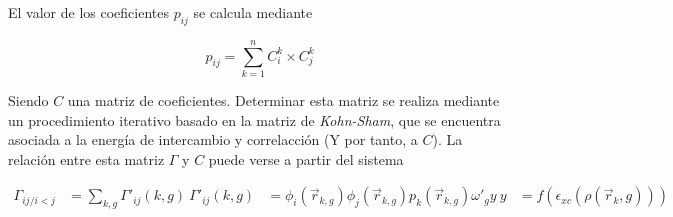 El valor de los coeficientes $p_{ij}$ se calcula mediante

\begin{equation}
    p_{ij} = \sum_{k = 1}^n C_i^k \times C_j^k
\end{equation}

Siendo $C$ una matriz de coeficientes. Determinar esta matriz se realiza mediante un procedimiento iterativo basado en
la matriz de \textit{Kohn-Sham}, que se encuentra asociada a la energ\'ia de intercambio y correlacci\'on (Y por tanto, a $C$).
La relaci\'on entre esta matriz $\Gamma$ y $C$ puede verse a partir del sistema

\begin{align}
    \Gamma_{ij / i < j} & = \sum_{k,g} \Gamma'_{ij}(k,g) \
    \Gamma'_{ij}(k,g) & = \phi_i(\vec{r}_{k,g})\phi_j(\vec{r}_{k,g})p_k(\vec{r}_{k,g}) \omega'_g y \
    y & = f(\epsilon_{xc}(\rho(\vec{r}_k,g)))
\end{align}
